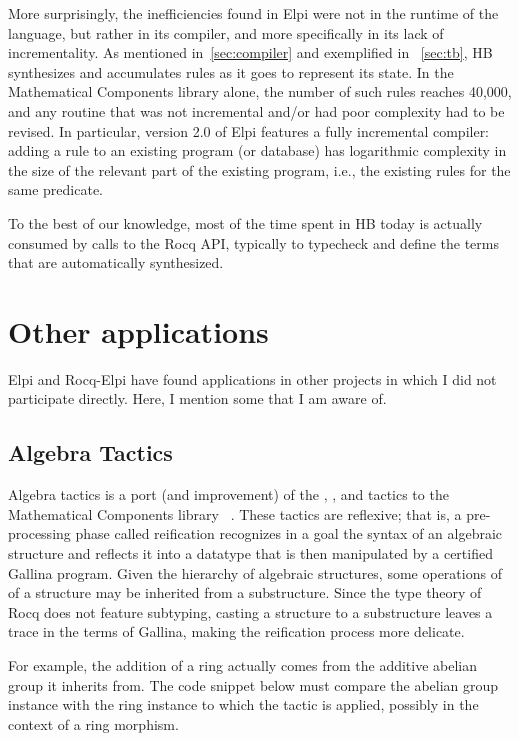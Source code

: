 \documentclass[a4paper, 11pt]{book}
\begin{document}
More surprisingly, the inefficiencies found in Elpi were not in the runtime of
the language, but rather in its compiler, and more specifically in its lack of
incrementality. As mentioned in~\cref{sec:compiler} and exemplified in
~\cref{sec:tb}, HB synthesizes and accumulates rules as it goes to represent
its state. In the Mathematical Components library alone, the number of such
rules reaches 40,000, and any routine that was not incremental and/or had poor
complexity had to be revised. In particular, version 2.0 of Elpi features a
fully incremental compiler: adding a rule to an existing program (or database)
has logarithmic complexity in the size of the relevant part of the existing
program, i.e., the existing rules for the same predicate.

To the best of our knowledge, most of the time spent in HB today is actually
consumed by calls to the Rocq API, typically to typecheck and define the terms
that are automatically synthesized.

\section{Other applications}


Elpi and Rocq-Elpi have found applications in other projects in which I did not
participate directly. Here, I mention some that I am aware of.

\subsection{Algebra Tactics}

Algebra tactics is a port (and improvement) of the , ,
and  tactics to the Mathematical Components library
~\cite{sakaguchi:LIPIcs.ITP.2022.29}. These tactics are reflexive; that is, a
pre-processing phase called reification recognizes in a goal the syntax of an
algebraic structure and reflects it into a datatype that is then manipulated by
a certified Gallina program. Given the hierarchy of algebraic structures, some operations
of of a structure may be inherited from a substructure. Since the type
theory of Rocq does not feature subtyping, casting a structure to a
substructure leaves a trace in the terms of Gallina, making the reification
process more delicate.

For example, the addition of a ring actually comes from the additive abelian
group it inherits from. The code snippet below must compare the abelian group
instance  with the ring instance  to which the tactic is
applied, possibly in the context  of a ring morphism.
\end{document}
